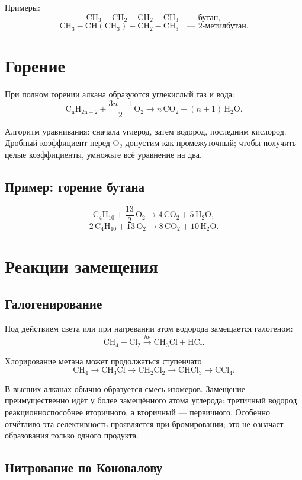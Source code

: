 \documentclass[a4paper,12pt]{article}
\newcommand{\chem}[1]{\ensuremath{\mathrm{#1}}}
\begin{document}
Примеры:
\[
\chem{CH_3-CH_2-CH_2-CH_3}\quad\text{--- бутан},
\]
\[
\chem{CH_3-CH(CH_3)-CH_2-CH_3}\quad\text{--- 2-метилбутан}.
\]

\section{Горение}

При полном горении алкана образуются углекислый газ и вода:
\[
\chem{C_{n}H_{2n+2}}+\frac{3n+1}{2}\,\chem{O_2}
\longrightarrow n\,\chem{CO_2}+(n+1)\,\chem{H_2O}.
\]

Алгоритм уравнивания: сначала углерод, затем водород, последним кислород. Дробный коэффициент перед \chem{O_2} допустим как промежуточный; чтобы получить целые коэффициенты, умножьте всё уравнение на два.

\subsection{Пример: горение бутана}

\[
\chem{C_4H_{10}}+\frac{13}{2}\,\chem{O_2}\longrightarrow
4\,\chem{CO_2}+5\,\chem{H_2O},
\]
\[
\boxed{2\,\chem{C_4H_{10}}+13\,\chem{O_2}\longrightarrow
8\,\chem{CO_2}+10\,\chem{H_2O}}.
\]

\section{Реакции замещения}

\subsection{Галогенирование}

Под действием света или при нагревании атом водорода замещается галогеном:
\[
\chem{CH_4+Cl_2}\xrightarrow{h\nu}\chem{CH_3Cl+HCl}.
\]

Хлорирование метана может продолжаться ступенчато:
\[
\chem{CH_4}\longrightarrow\chem{CH_3Cl}\longrightarrow\chem{CH_2Cl_2}
\longrightarrow\chem{CHCl_3}\longrightarrow\chem{CCl_4}.
\]

В высших алканах обычно образуется смесь изомеров. Замещение преимущественно идёт у более замещённого атома углерода: третичный водород реакционноспособнее вторичного, а вторичный --- первичного. Особенно отчётливо эта селективность проявляется при бромировании; это не означает образования только одного продукта.

\subsection{Нитрование по Коновалову}
\end{document}
